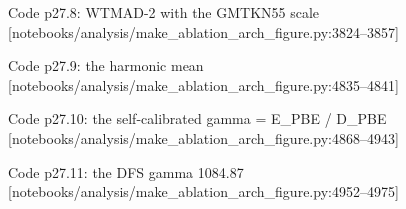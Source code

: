 \begin{frame}[allowframebreaks]{Code p27.8: WTMAD-2 with the GMTKN55 scale [notebooks/analysis/make\_ablation\_arch\_figure.py:3824--3857]}
\label{code:p27_8_wtmad_2_with_the_gmtkn55_scale}
\end{frame}
\begin{frame}[allowframebreaks]{Code p27.9: the harmonic mean [notebooks/analysis/make\_ablation\_arch\_figure.py:4835--4841]}
\label{code:p27_9_the_harmonic_mean}
\end{frame}
\begin{frame}[allowframebreaks]{Code p27.10: the self-calibrated gamma = E\_PBE / D\_PBE [notebooks/analysis/make\_ablation\_arch\_figure.py:4868--4943]}
\label{code:p27_10_the_self_calibrated_gamma_e_pbe_d_pbe}
\end{frame}
\begin{frame}[allowframebreaks]{Code p27.11: the DFS gamma 1084.87 [notebooks/analysis/make\_ablation\_arch\_figure.py:4952--4975]}
\label{code:p27_11_the_dfs_gamma_1084_87}
\end{frame}
